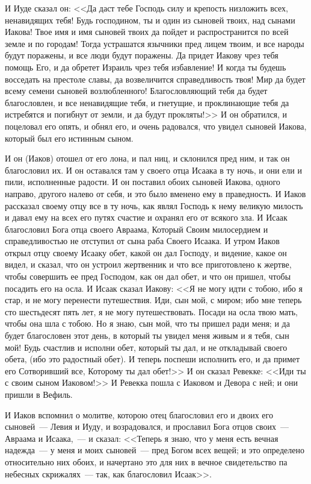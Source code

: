 И Иуде сказал он: <<Да даст тебе Господь силу и
крепость низложить всех, ненавидящих тебя! Будь
господином, ты и один из сыновей твоих, над сынами
Иакова! Твое имя и имя сыновей твоих да пойдет и
распространится по всей земле и по городам! Тогда
устрашатся язычники пред лицем твоим, и все
народы будут поражены, и все люди будут поражены.
Да придет Иакову чрез тебя помощь Его, и да
обретет Израиль чрез тебя избавление! И когда ты
будешь восседать на престоле славы, да
возвеличится справедливость твоя! Мир да будет
всему семени сыновей возлюбленного!
Благословляющий тебя да будет благословлен, и
все ненавидящие тебя, и гнетущие, и проклинающие
тебя да истребятся и погибнут от земли, и да будут
прокляты!>> И он обратился, и поцеловал его
опять, и обнял его, и очень радовался, что увидел
сыновей Иакова, который был его истинным сыном.

И он (Иаков) отошел от его лона, и пал ниц, и
склонился пред ним, и так он благословил их. И он
оставался там у своего отца Исаака в ту ночь, и
они ели и пили, исполненные радости. И он поставил
обоих сыновей Иакова, одного направо, другого
налево от себя, и это было вменено ему в
праведность. И Иаков рассказал своему отцу все в
ту ночь, как являл Господь к нему великую милость
и давал ему на всех его путях счастие и охранял
его от всякого зла. И Исаак благословил Бога отца
своего Авраама, Который Своим милосердием и
справедливостью не отступил от сына раба Своего
Исаака. И утром Иаков открыл отцу своему Исааку
обет, какой он дал Господу, и видение, какое он
видел, и сказал, что он устроил жертвенник и что
все приготовлено к жертве, чтобы совершить ее
пред Господом, как он дал обет, и что он пришел,
чтобы посадить его на осла. И Исаак сказал Иакову:
<<Я не могу идти с тобою, ибо я стар, и не могу
перенести путешествия. Иди, сын мой, с миром; ибо
мне теперь сто шестьдесят пять лет, я не могу
путешествовать. Посади на осла твою мать,
чтобы она шла с тобою. Но я знаю, сын мой, что ты
пришел ради меня; и да будет благословен этот
день, в который ты увидел меня живым и я тебя, сын
мой! Будь счастлив и исполни обет, который ты дал,
и не откладывай своего обета, (ибо это радостный
обет). И теперь поспеши исполнить его, и да примет
его Сотворивший все, Которому ты дал обет!>> И он
сказал Ревекке: <<Иди ты с своим сыном
Иаковом!>> И Ревекка пошла с Иаковом и Девора с
ней; и они пришли в Вефиль.

И Иаков вспомнил о молитве, которою отец
благословил его и двоих его сыновей~--- Левия и
Иуду, и возрадовался, и прославил Бога отцов
своих~--- Авраама и Исаака,~--- и сказал: <<Теперь я
знаю, что у меня есть вечная надежда~--- у меня и
моих сыновей~--- пред Богом всех вещей; и это
определено относительно них обоих, и начертано
это для них в вечное свидетельство па небесных
скрижалях~--- так, как благословил Исаак>>.

